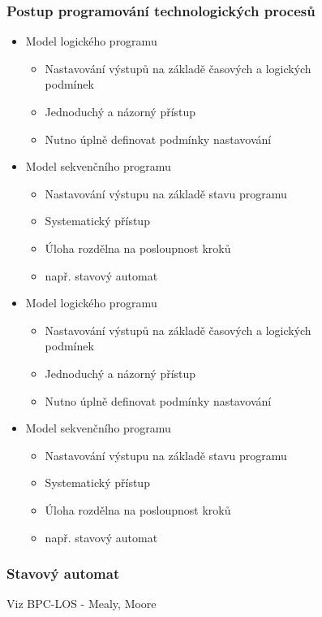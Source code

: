 \begin{figure}[h]
\subsubsection*{Postup programování technologických procesů}
\begin{itemize}
  \item Model logického programu \begin{itemize}
    \item Nastavování výstupů na základě časových a logických podmínek
    \item Jednoduchý a názorný přístup
    \item Nutno úplně definovat podmínky nastavování
  \end{itemize}
  \item Model sekvenčního programu \begin{itemize}
    \item Nastavování výstupu na základě stavu programu
    \item Systematický přístup
    \item Úloha rozdělna na posloupnost kroků
    \item např. stavový automat
  \end{itemize}
    \item Model logického programu \begin{itemize}
              \item Nastavování výstupů na základě časových a logických podmínek
              \item Jednoduchý a názorný přístup
              \item Nutno úplně definovat podmínky nastavování
          \end{itemize}
    \item Model sekvenčního programu \begin{itemize}
              \item Nastavování výstupu na základě stavu programu
              \item Systematický přístup
              \item Úloha rozdělna na posloupnost kroků
              \item např. stavový automat
          \end{itemize}
\end{itemize}

\subsubsection*{Stavový automat}
Viz BPC-LOS - Mealy, Moore


\end{figure}
